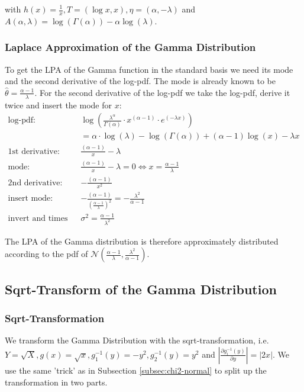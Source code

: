 \documentclass{article}
\begin{document}
with $h(x) = \frac{1}{x}, T=(\log x, x), \eta=(\alpha, -\lambda)$ and $A(\alpha, \lambda) = \log(\Gamma(\alpha)) - \alpha  \log(\lambda)$. 

\subsubsection{Laplace Approximation of the Gamma Distribution}

To get the LPA of the Gamma function in the standard basis we need its mode and the second derivative of the log-pdf. The mode is already known to be $\hat{\theta} = \frac{\alpha -1}{\lambda}$. For the second derivative of the log-pdf we take the log-pdf, derive it twice and insert the mode for $x$:
\begin{align*}
\text{log-pdf: } &\log\left( \frac{\lambda^\alpha}{\Gamma(\alpha)} \cdot x^{(\alpha - 1)} \cdot e^{(-\lambda x)}\right) \\
&= \alpha \cdot \log(\lambda) - \log(\Gamma(\alpha)) + (\alpha -1)\log(x) -\lambda x\\
\text{1st derivative: }& \frac{(\alpha-1)}{x} - \lambda \\
\text{mode: }&  \frac{(\alpha-1)}{x} - \lambda = 0 \Leftrightarrow x=\frac{\alpha -1}{\lambda}\\
\text{2nd derivative: }& -\frac{(\alpha-1)}{x^2}\\
\text{insert mode: }& -\frac{(\alpha-1)}{(\frac{\alpha -1}{\lambda})^2} = -\frac{\lambda^2}{\alpha - 1} \\
\text{invert and times -1: }&\sigma^2 = \frac{\alpha-1}{\lambda^2}
\end{align*}

The LPA of the Gamma distribution is therefore approximately distributed according to the pdf of $\mathcal{N}(\frac{\alpha - 1}{\lambda}, \frac{\lambda^2}{\alpha-1})$.

\subsection{Sqrt-Transform of the Gamma Distribution}

\subsubsection{Sqrt-Transformation}

We transform the Gamma Distribution with the sqrt-transformation, i.e. $Y = \sqrt{X}, g(x) = \sqrt{x}, g_1^{-1}(y) = -y^2, g_2^{-1}(y) = y^2$ and $\left\vert\frac{\partial g_i^{-1}(y)}{\partial y} \right\vert = \vert 2x \vert$. We use the same 'trick' as in Subsection \ref{subsec:chi2-normal} to split up the transformation in two parts. 
\end{document}
